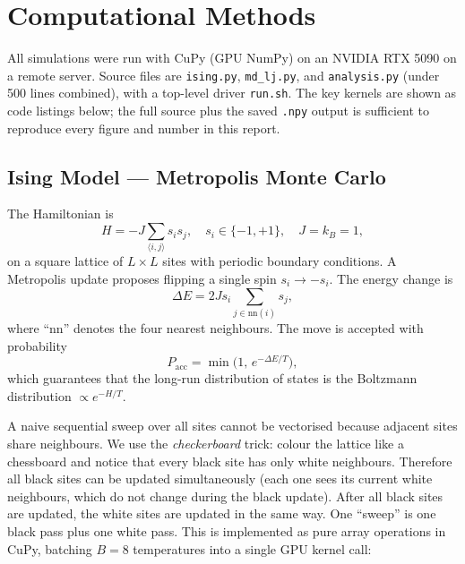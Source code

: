 \documentclass[12pt,a4paper]{article}
\begin{document}
\section{Computational Methods}

All simulations were run with CuPy (GPU NumPy) on an NVIDIA RTX 5090 on a remote server.
Source files are \texttt{ising.py}, \texttt{md\_lj.py}, and \texttt{analysis.py} (under
500 lines combined), with a top-level driver \texttt{run.sh}. The key kernels are shown
as code listings below; the full source plus the saved \texttt{.npy} output is sufficient
to reproduce every figure and number in this report.

\subsection{Ising Model --- Metropolis Monte Carlo}

The Hamiltonian is
\begin{equation}
  H = -J \sum_{\langle i,j \rangle} s_i s_j,
  \quad s_i \in \{-1,+1\}, \quad J = k_B = 1,
\end{equation}
on a square lattice of $L \times L$ sites with periodic boundary conditions. A Metropolis
update proposes flipping a single spin $s_i \to -s_i$. The energy change is
\begin{equation}
  \Delta E = 2 J s_i \sum_{j \in \text{nn}(i)} s_j,
\end{equation}
where ``nn'' denotes the four nearest neighbours. The move is accepted with probability
\begin{equation}
  P_\mathrm{acc} = \min\!\bigl(1,\, e^{-\Delta E / T}\bigr),
  \label{eq:metropolis}
\end{equation}
which guarantees that the long-run distribution of states is the Boltzmann distribution
$\propto e^{-H/T}$.

A naive sequential sweep over all sites cannot be vectorised because adjacent sites share
neighbours. We use the \emph{checkerboard} trick: colour the lattice like a chessboard
and notice that every black site has only white neighbours. Therefore all black sites can
be updated simultaneously (each one sees its current white neighbours, which do not
change during the black update). After all black sites are updated, the white sites are
updated in the same way. One ``sweep'' is one black pass plus one white pass. This is
implemented as pure array operations in CuPy, batching $B = 8$ temperatures into a single
GPU kernel call:
\end{document}
